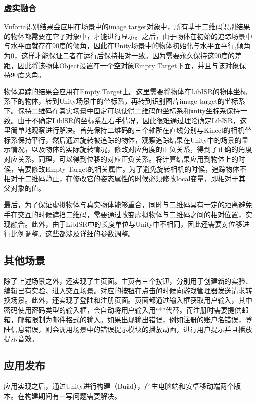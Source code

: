 \subsubsection{虚实融合}
Vuforia识别结果会应用在场景中的image target对象中，所有基于二维码识别结果的物体都需要在它子对象中，才能进行显示。之后，由于物体在初始的追踪场景中与水平面就存在90度的倾角，因此在Unity场景中的物体初始化与水平面平行,倾角为0，这样才能保证二者在运行后保持相对一致。因为需要永久保持这90度的差距，因此将该物体Object设置在一个空对象Empty Target下面，并且与该对象保持90度夹角。

物体追踪的结果会应用在Empty Target上。这里需要将物体在LibISR的物体坐标系下的物体，转到Unity场景中的坐标系，再转到识别图片image target的坐标系下。保持二维码在真实场景中固定可以使得二维码的坐标系和unity坐标系保持一致。由于不确定LibISR的坐标系左右手情况，因此很难通过理论确定LibISR，这里简单地观察进行解决。首先保持二维码的三个轴所在直线分别与Kinect的相机坐标系保持平行，然后通过旋转被追踪的物体，观察追踪结果在Unity中的场景的显示情况，以及物体的实际旋转情况，修改对应角度的正负关系，得到了正确的角度对应关系。同理，可以得到位移的对应正负关系。将计算结果应用到物体上的时候，需要修改Empty Target的相关属性。为了避免旋转相机的时候，追踪物体不相对于二维码静止，在修改它的姿态属性的时候必须修改local变量，即相对于其父对象的值。

最后，为了保证虚拟物体与真实物体能够重合，同时与二维码具有一定的距离避免手在交互的时候遮挡二维码，需要通过改变虚拟物体与二维码之间的相对位置，实现融合。此外，由于LibISR中的长度单位与Unity中不相同，因此还需要对位移进行比例调整。这些都涉及详细的参数调整。


\subsection{其他场景}

    除了上述场景之外，还实现了主页面。主页有三个按钮，分别用于创建新的实验、编辑已有实验、进入交互场景。对应的按钮在点击的时候向游戏管理器发送请求转换场景。此外，还实现了登陆和注册页面。页面都通过输入框获取用户输入，其中密码使用密码类型的输入框，会自动将用户输入用“*”代替。而注册时需要提供邮箱，邮箱限制为邮件格式的输入。如果出现输出错误，例如注册的账户名错误，登陆信息错误，则会调用场景中的错误提示模块的播放动画，进行用户提示并且播放提示音效。

\subsection{应用发布}

    应用实现之后，通过Unity进行构建（Build），产生电脑端和安卓移动端两个版本。在构建期间有一写问题需要解决。
    
